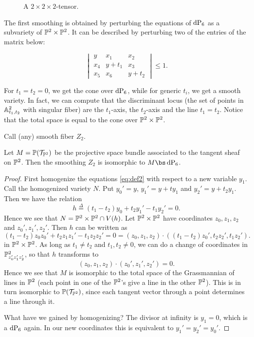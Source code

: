 \begin{figure}[b]
\centering

\caption{A $2 \times 2 \times 2$-tensor.}
\label{fig:p1p1p1_equations}
\end{figure}

The first smoothing is obtained by perturbing the equations of $\dP6$ as a subvariety of $\P^2 \times \P^2$.  It can be described by perturbing two of the entries of the matrix below:

\begin{equation}
\label{eq:def2}
\begin{vmatrix}
y & x_1 & x_2 \\
x_4 & y+t_1 & x_3 \\
x_5 & x_6 & y+t_2
\end{vmatrix} \leq 1.
\end{equation}


For $t_1=t_2=0$, we get the cone over $\dP6$, while for generic $t_i$, we get a smooth variety. In fact, we can compute that the discriminant locus (the set of points in $\A^2_{t_1,t_2}$ with singular fiber) are the $t_1$-axis, the $t_2$-axis and the line $t_1=t_2$. Notice that the total space is equal to the cone over $\P^2 \times \P^2$.

Call (any) smooth fiber $Z_2$. 

\begin{lemma}
Let $M=\P(\mathcal T_ {\P^2})$ be the projective space bundle associated to the tangent sheaf on $\P^2$. Then the smoothing $Z_2$ is isomorphic to $M \bs \dP6$. 
\end{lemma}
\begin{proof}
First homogenize the equations \eqref{eq:def2} with respect to a new variable $y_1$. Call the homogenized variety $N$. Put $y_0'=y$, $y_1' = y+ty_1$ and $y_2'=y+t_2y_1$. Then we have the relation
\[
h \stackrel{\Delta}= (t_1-t_2)y_0 +t_2 y_1' - t_1 y_2' = 0.
\]
Hence we see that $N=\P^2 \times \P^2 \cap V(h)$. Let $\P^2 \times \P^2$ have coordinates $z_0,z_1,z_2$ and $z_0',z_1',z_2'$. Then $h$ can be written as 
\[
(t_1-t_2) z_0z_0' + t_ 2 z_1 z_1' - t_1 z_2 z_2' = 0 = (z_0,z_1,z_2) \cdot \left( \left(t_1-t_2\right) z_0', t_2 z_2', t_1 z_2' \right).
\]
in $\P^2 \times \P^2$. As long as $t_1 \neq t_2$ and $t_1,t_2 \neq 0$, we can do a change of coordinates in $\P^2_{z_0'z_1'z_2'}$, so that $h$ transforms to
\[
(z_0,z_1,z_2) \cdot (z_0',z_1',z_2') = 0.
\]
Hence we see that $M$ is isomorphic to the total space of the Grassmannian of lines in $\P^2$ (each point in one of the $\P^2$'s give a line in the other $\P^2$). This is in turn isomorphic to $\P(\mathcal T_{\P^2})$, since each tangent vector through a point determines a line through it.

What have we gained by homogenizing? The divisor at infinity is $y_1=0$, which is a $\dP6$ again. In our new coordinates this is equivalent to $y_1'=y_2'=y_0'$.
\end{proof}

